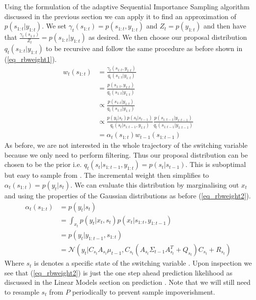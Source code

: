 Using the formulation of the adaptive Sequential Importance Sampling algorithm discussed in the previous section we can apply it to find an approximation of $p(s_{1:t}|y_{1:t})$. We set $\gamma_t(s_{1:t})=p(s_{1:t},y_{1:t})$ and $Z_t=p(y_{1:t})$ and then have that $\frac{\gamma_t(s_{1:t})}{Z_t} = p(s_{1:t}|y_{1:t})$ as desired. We then choose our proposal distribution $q_t(s_{1:t}|y_{1:t})$ to be recursive and follow the same procedure as before shown in (\ref{eq_rbweight1}).
\begin{equation}
\begin{aligned}
w_t(s_{1:t}) &= \frac{\gamma_t(s_{1:t},y_{1:t})}{q_t(s_{1:t}|y_{1:t})} \\
&= \frac{p(s_{1:t},y_{1:t})}{q_t(s_{1:t}|y_{1:t})} \\
&\propto \frac{p(s_{1:t}|y_{1:t})}{q_t(s_{1:t}|y_{1:t})} \\
&\propto \frac{p(y_t|s_t)p(s_t|s_{t-1})}{q_t(s_t|s_{1:t-1},y_{1:t})}\frac{p(s_{1:t-1}|y_{1:t-1})}{q_t(s_{1:t-1}|y_{1:t-1})} \\
&= \alpha_t(s_{1:t})w_{t-1}(s_{1:t-1})
\end{aligned}
\label{eq_rbweight1}
\end{equation}
As before, we are not interested in the whole trajectory of the switching variable because we only need to perform filtering. Thus our proposal distribution can be chosen to be the prior i.e. $q_t(s_t|s_{1:t-1},y_{1:t}) = p(s_t|s_{t-1})$. This is suboptimal but easy to sample from \cite{doucet}. The incremental weight then simplifies to $\alpha_t(s_{1:t}) = p(y_t|s_t)$. We can evaluate this distribution by marginalising out $x_t$ and using the properties of the Gaussian distributions as before (\ref{eq_rbweight2}).
\begin{equation}
\begin{aligned}
\alpha_t(s_{1:t}) &= p(y_t|s_t) \\
&= \int_{x_t} p(y_t|x_t,s_t)p(x_t|s_{1:t},y_{1:t-1}) \\
&= p(y_t|y_{1:t-1}, s_{1:t}) \\
&= \mathcal{N}\left(y_t | C_{s_t}A_{s_t}\mu_{t-1}, C_{s_t}\left(A_{s_t}\Sigma_{t-1}A_{s_t}^T+Q_{s_t} \right)C_{s_t} + R_{s_t} \right)
\end{aligned}
\label{eq_rbweight2}
\end{equation} 
Where $s_t$ is denotes a specific state of the switching variable \cite{murphy1}. Upon inspection we see that (\ref{eq_rbweight2}) is just the one step ahead prediction likelihood as discussed in the Linear Models section on prediction \cite{murphy1}. Note that we will still need to resample $s_t$ from $P$ periodically to prevent sample impoverishment. 

